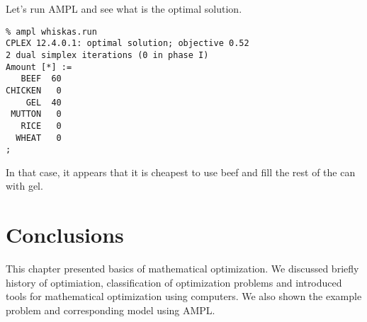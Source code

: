 Let's run AMPL and see what is the optimal solution.

\begin{lstlisting}
% ampl whiskas.run
CPLEX 12.4.0.1: optimal solution; objective 0.52
2 dual simplex iterations (0 in phase I)
Amount [*] :=
   BEEF  60
CHICKEN   0
    GEL  40
 MUTTON   0
   RICE   0
  WHEAT   0
;
\end{lstlisting}

In that case, it appears that it is cheapest to use beef and fill the rest of the can with gel.


\section{Conclusions}

This chapter presented basics of mathematical optimization. We discussed briefly history of optimiation, classification of optimization problems and introduced tools for mathematical optimization using computers. We also shown the example problem and corresponding model using AMPL.